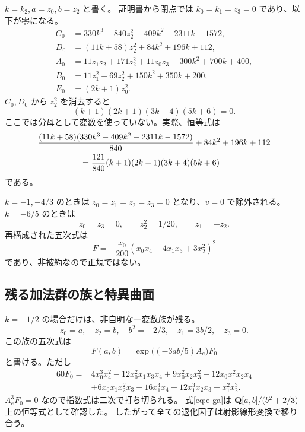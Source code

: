 \documentclass[11pt,a4paper]{ltjsarticle}
\theoremstyle{remark}\newtheorem{remark}[theorem]{注意}
\begin{document}
$k=k_2,a=z_0,b=z_2$ と書く。
証明書から閉点では $k_0=k_1=z_3=0$ であり、以下が零になる。
\begin{align*}
 C_0&=330k^3-840z_2^2-409k^2-2311k-1572,\\
 D_0&=(11k+58)z_2^2+84k^2+196k+112,\\
 A_0&=11z_1z_2+171z_2^2+11z_0z_3+300k^2+700k+400,\\
 B_0&=11z_1^2+69z_2^2+150k^2+350k+200,\\
 E_0&=(2k+1)z_0^2.
\end{align*}
$C_0,D_0$ から $z_2^2$ を消去すると
\begin{equation}\label{eq:e-k-four}
                    (k+1)(2k+1)(3k+4)(5k+6)=0.
\end{equation}
ここでは分母として変数を使っていない。実際、恒等式は
\begin{align*}
 &\frac{(11k+58)(330k^3-409k^2-2311k-1572)}{840}
             +84k^2+196k+112\\
 &\hspace{18mm}=\frac{121}{840}(k+1)(2k+1)(3k+4)(5k+6)
\end{align*}
である。

$k=-1,-4/3$ のときは $z_0=z_1=z_2=z_3=0$ となり、$v=0$ で除外される。
$k=-6/5$ のときは
\[
                     z_0=z_3=0,\qquad z_2^2=1/20,\qquad z_1=-z_2.
\]
再構成された五次式は
\begin{equation}\label{eq:e-double}
           F=-\frac{x_0}{200}(x_0x_4-4x_1x_3+3x_2^2)^2
\end{equation}
であり、非被約なので正規ではない。

\subsection{残る加法群の族と特異曲面}

$k=-1/2$ の場合だけは、非自明な一変数族が残る。
\[
                z_0=a,\quad z_2=b,\quad b^2=-2/3,\quad
                z_1=3b/2,\quad z_3=0.
\]
この族の五次式は
\begin{equation}\label{eq:e-ga}
                    F(a,b)=\exp\bigl((-3ab/5)A_e\bigr)F_0
\end{equation}
と書ける。ただし
\begin{equation}\label{eq:e-F0}
\begin{split}
60F_0={}&4x_0^3x_4^2-12x_0^2x_1x_3x_4+9x_0^2x_2x_3^2
       -12x_0x_1^2x_2x_4\\
 &+6x_0x_1x_2^2x_3+16x_1^4x_4-12x_1^3x_2x_3+x_1^2x_2^3.
\end{split}
\end{equation}
$A_e^3F_0=0$ なので指数式は二次で打ち切られる。
式\eqref{eq:e-ga}は $\mathbf Q[a,b]/(b^2+2/3)$ 上の恒等式として確認した。
したがって全ての退化因子は射影線形変換で移り合う。
\end{document}
